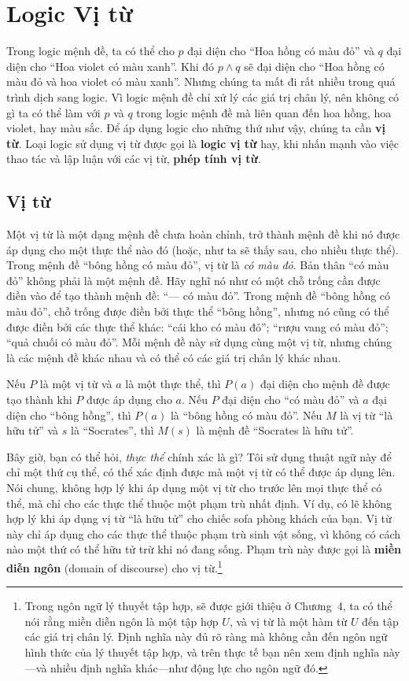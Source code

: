 \section{Logic Vị từ}

Trong logic mệnh đề, ta có thể cho $p$ đại diện cho ``Hoa hồng có màu đỏ'' và $q$ đại diện cho ``Hoa violet có màu xanh''. Khi đó $p \land q$ sẽ đại diện cho ``Hoa hồng có màu đỏ và hoa violet có màu xanh''. Nhưng chúng ta mất đi rất nhiều trong quá trình dịch sang logic. Vì logic mệnh đề chỉ xử lý các giá trị chân lý, nên không có gì ta có thể làm với $p$ và $q$ trong logic mệnh đề mà liên quan đến hoa hồng, hoa violet, hay màu sắc. Để áp dụng logic cho những thứ như vậy, chúng ta cần \textbf{vị từ}. Loại logic sử dụng vị từ được gọi là \textbf{logic vị từ} hay, khi nhấn mạnh vào việc thao tác và lập luận với các vị từ, \textbf{phép tính vị từ}.

\subsection{Vị từ}

Một vị từ là một dạng mệnh đề chưa hoàn chỉnh, trở thành mệnh đề khi nó được áp dụng cho một thực thể nào đó (hoặc, như ta sẽ thấy sau, cho nhiều thực thể). Trong mệnh đề ``bông hồng có màu đỏ'', vị từ là \textit{có màu đỏ}. Bản thân ``có màu đỏ'' không phải là một mệnh đề. Hãy nghĩ nó như có một chỗ trống cần được điền vào để tạo thành mệnh đề: ``--- có màu đỏ''. Trong mệnh đề ``bông hồng có màu đỏ'', chỗ trống được điền bởi thực thể ``bông hồng'', nhưng nó cũng có thể được điền bởi các thực thể khác: ``cái kho có màu đỏ''; ``rượu vang có màu đỏ''; ``quả chuối có màu đỏ''. Mỗi mệnh đề này sử dụng cùng một vị từ, nhưng chúng là các mệnh đề khác nhau và có thể có các giá trị chân lý khác nhau.

Nếu $P$ là một vị từ và $a$ là một thực thể, thì $P(a)$ đại diện cho mệnh đề được tạo thành khi $P$ được áp dụng cho $a$. Nếu $P$ đại diện cho ``có màu đỏ'' và $a$ đại diện cho ``bông hồng'', thì $P(a)$ là ``bông hồng có màu đỏ''. Nếu $M$ là vị từ ``là hữu tử'' và $s$ là ``Socrates'', thì $M(s)$ là mệnh đề ``Socrates là hữu tử''.

Bây giờ, bạn có thể hỏi, \textit{thực thể} chính xác là gì? Tôi sử dụng thuật ngữ này để chỉ một thứ cụ thể, có thể xác định được mà một vị từ có thể được áp dụng lên. Nói chung, không hợp lý khi áp dụng một vị từ cho trước lên mọi thực thể có thể, mà chỉ cho các thực thể thuộc một phạm trù nhất định. Ví dụ, có lẽ không hợp lý khi áp dụng vị từ ``là hữu tử'' cho chiếc sofa phòng khách của bạn. Vị từ này chỉ áp dụng cho các thực thể thuộc phạm trù sinh vật sống, vì không có cách nào một thứ có thể hữu tử trừ khi nó đang sống. Phạm trù này được gọi là \textbf{miền diễn ngôn} (domain of discourse) cho vị từ.\footnote{Trong ngôn ngữ lý thuyết tập hợp, sẽ được giới thiệu ở Chương~4, ta có thể nói rằng miền diễn ngôn là một tập hợp $U$, và vị từ là một hàm từ $U$ đến tập các giá trị chân lý. Định nghĩa này đủ rõ ràng mà không cần đến ngôn ngữ hình thức của lý thuyết tập hợp, và trên thực tế bạn nên xem định nghĩa này---và nhiều định nghĩa khác---như động lực cho ngôn ngữ đó.}

